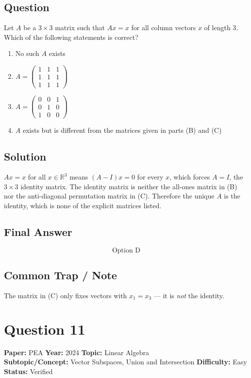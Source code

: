 \documentclass[11pt]{article}
\begin{document}
\subsection*{Question}
Let $A$ be a $3\times 3$ matrix such that $Ax=x$ for all column vectors $x$ of length $3$. Which of the following statements is correct?
\begin{enumerate}[label=(\Alph*)]
\item No such $A$ exists
\item $A=\begin{pmatrix}1&1&1\\1&1&1\\1&1&1\end{pmatrix}$
\item $A=\begin{pmatrix}0&0&1\\0&1&0\\1&0&0\end{pmatrix}$
\item $A$ exists but is different from the matrices given in parts (B) and (C)
\end{enumerate}

\subsection*{Solution}
$Ax=x$ for all $x\in\mathbb{R}^{3}$ means $(A-I)x=0$ for every $x$, which forces $A=I$, the $3\times 3$ identity matrix. The identity matrix is neither the all-ones matrix in (B) nor the anti-diagonal permutation matrix in (C). Therefore the unique $A$ is the identity, which is none of the explicit matrices listed.

\subsection*{Final Answer}
\[
\boxed{\text{Option D}}
\]

\subsection*{Common Trap / Note}
The matrix in (C) only fixes vectors with $x_1=x_3$ --- it is \emph{not} the identity.

\section*{Question 11}
\textbf{Paper:} PEA \quad \textbf{Year:} 2024 \quad \textbf{Topic:} Linear Algebra \\
\textbf{Subtopic/Concept:} Vector Subspaces, Union and Intersection \quad \textbf{Difficulty:} Easy \quad \textbf{Status:} Verified
\end{document}
